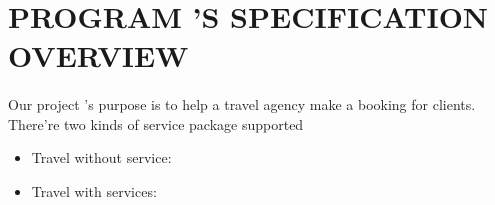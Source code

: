 \section{PROGRAM 'S SPECIFICATION OVERVIEW}

\paragraph{}
Our project 's purpose is to help a travel agency make a booking for clients. There're two kinds of service package supported

\begin{itemize}
\item Travel without service: 
\item Travel with services: 
\end{itemize}